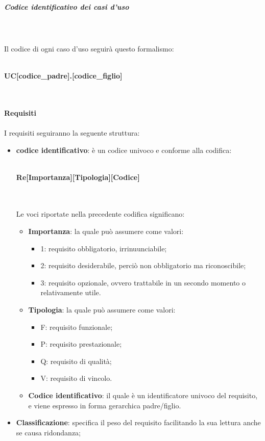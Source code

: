 				\subparagraph*{Codice identificativo dei casi d'uso} \mbox{} \\ \mbox{} \\
			Il codice di ogni caso d'uso seguirà questo formalismo: \\ \\
			\centerline{\textbf{UC[codice\_padre].[codice\_figlio]}} \\ \\
			\textbf{Requisiti} \\ \\
			I requisiti seguiranno la seguente struttura:
				\begin{itemize}
					\item \textbf{codice identificativo}: è un codice univoco e conforme alla codifica: \\ \\
					\centerline{\textbf{Re[Importanza][Tipologia][Codice]}} \\ \\
					Le voci riportate nella precedente codifica significano: 
					\begin{itemize}
						\item \textbf{Importanza}: la quale può assumere come valori:
						\begin{itemize}
							\item 1: requisito obbligatorio, irrinuunciabile;
							\item 2: requisito desiderabile, perciò non obbligatorio ma riconoscibile;
							\item 3: requisito opzionale, ovvero trattabile in un secondo momento o relativamente utile.
						\end{itemize}
						\item \textbf{Tipologia}: la quale può assumere come valori:
						\begin{itemize}
							\item F: requisito funzionale;
							\item P: requisito prestazionale;
							\item Q: requisito di qualità;
							\item V: requisito di vincolo.
						\end{itemize}
						\item \textbf{Codice identificativo}: il quale è un identificatore univoco del requisito, e viene espresso in forma gerarchica padre/figlio.
					\end{itemize}
					\item \textbf{Classificazione}: specifica il peso del requisito facilitando la sua lettura anche se causa ridondanza;

\end{itemize}
